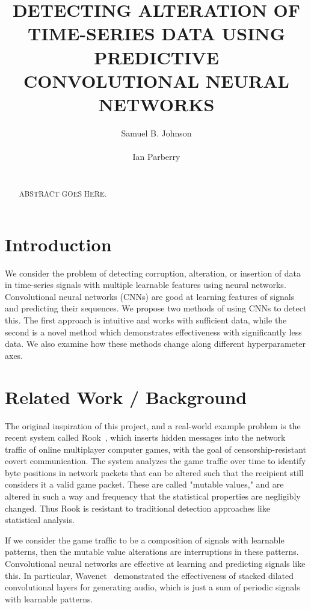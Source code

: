 \documentclass{acm_proc_article-sp}
\title{DETECTING ALTERATION OF TIME-SERIES DATA USING PREDICTIVE CONVOLUTIONAL NEURAL NETWORKS}
\author{
  \alignauthor
  Samuel B. Johnson\\
    \affaddr{Dept.\ of Computer Sci.\ \& Eng.}\\
    \affaddr{University of North Texas}
  \alignauthor
  Ian Parberry\\
    \affaddr{Dept.\ of Computer Sci.\ \& Eng.}\\
    \affaddr{University of North Texas}
  }
\begin{document}
 \sloppy
  \maketitle
  
  \begin{abstract} 
  ABSTRACT GOES HERE.
  \end{abstract}
  
  
  
  
  \section{Introduction}  
  \label{sec:intro}
  
  We consider the problem of detecting corruption, alteration, or insertion of data in time-series signals with multiple learnable features using neural networks. Convolutional neural networks (CNNs) are good at learning features of signals and predicting their sequences. We propose two methods of using CNNs to detect this. The first approach is intuitive and works with sufficient data, while the second is a novel method which demonstrates effectiveness with significantly less data. We also examine how these methods change along different hyperparameter axes.
  
  \section{Related Work / Background} 
  \label{sec:relatedWork}
  
  The original inspiration of this project, and a real-world example problem is the recent system called Rook~\cite{vines2015rook}, which inserts hidden messages into the network traffic of online multiplayer computer games, with the goal of censorship-resistant covert communication. The system analyzes the game traffic over time to identify byte positions in network packets that can be altered such that the recipient still considers it a valid game packet. These are called "mutable values," and are altered in such a way and frequency that the statistical properties are negligibly changed. Thus Rook is resistant to traditional detection approaches like statistical analysis.
  
  If we consider the game traffic to be a composition of signals with learnable patterns, then the mutable value alterations are interruptions in these patterns. Convolutional neural networks are effective at learning and predicting signals like this. In particular, Wavenet~\cite{DBLP:journals/corr/OordDZSVGKSK16} demonstrated the effectiveness of stacked dilated convolutional layers for generating audio, which is just a sum of periodic signals with learnable patterns.
  
\end{document}
